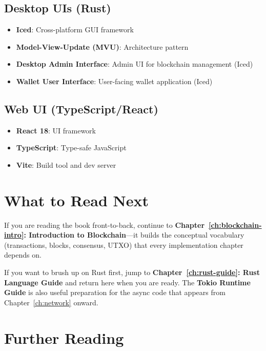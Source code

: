 \subsection{Desktop UIs (Rust)}
\label{subsec:desktop-uis}

\begin{itemize}
  \item \textbf{Iced}: Cross-platform GUI framework
  \item \textbf{Model-View-Update (MVU)}: Architecture pattern
  \item \textbf{Desktop Admin Interface}: Admin UI for blockchain management (Iced)
  \item \textbf{Wallet User Interface}: User-facing wallet application (Iced)
\end{itemize}

\subsection{Web UI (TypeScript/React)}
\label{subsec:web-ui}

\begin{itemize}
  \item \textbf{React 18}: UI framework
  \item \textbf{TypeScript}: Type-safe JavaScript
  \item \textbf{Vite}: Build tool and dev server
\end{itemize}

\section{What to Read Next}
\label{sec:what-next}

If you are reading the book front-to-back, continue to \textbf{Chapter~\ref{ch:blockchain-intro}: Introduction to Blockchain}---it builds the conceptual vocabulary (transactions, blocks, consensus, UTXO) that every implementation chapter depends on.

If you want to brush up on Rust first, jump to \textbf{Chapter~\ref{ch:rust-guide}: Rust Language Guide} and return here when you are ready. The \textbf{Tokio Runtime Guide} is also useful preparation for the async code that appears from Chapter~\ref{ch:network} onward.

\section{Further Reading}
\label{sec:further-reading}

